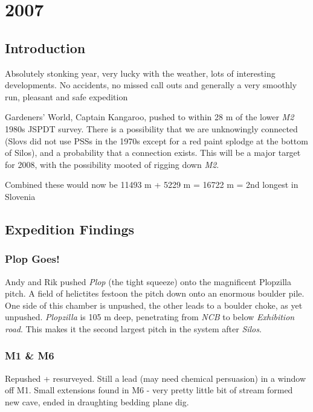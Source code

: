 \hypertarget{section}{%
\chapter{2007}\label{section}}

\hypertarget{introduction}{%
\section{Introduction}\label{introduction}}

Absolutely stonking year, very lucky with the weather, lots of
interesting developments. No accidents, no missed call outs and
generally a very smoothly run, pleasant and safe expedition

Gardeners' World, Captain Kangaroo, pushed to within 28 m of the lower
\emph{M2} 1980s JSPDT survey. There is a possibility that we are
unknowingly connected (Slovs did not use PSSs in the 1970s except for a
red paint splodge at the bottom of Silos), and a probability that a
connection exists. This will be a major target for 2008, with the
possibility mooted of rigging down \emph{M2}.

Combined these would now be 11493 m + 5229 m = 16722 m = 2nd longest in
Slovenia

\hypertarget{expedition-findings}{%
\section{Expedition Findings}\label{expedition-findings}}

\hypertarget{plop-goes}{%
\subsection{Plop Goes!}\label{plop-goes}}

Andy and Rik pushed \emph{Plop} (the tight squeeze) onto the magnificent
Plopzilla pitch. A field of helictites festoon the pitch down onto an
enormous boulder pile. One side of this chamber is unpushed, the other
leads to a boulder choke, as yet unpushed. \emph{Plopzilla} is 105 m
deep, penetrating from \emph{NCB} to below \emph{Exhibition road}. This
makes it the second largest pitch in the system after \emph{Silos}.

\hypertarget{m1-m6}{%
\subsection{M1 \& M6}\label{m1-m6}}

Repushed + resurveyed. Still a lead (may need chemical persuasion) in a
window off M1. Small extensions found in M6 - very pretty little bit of
stream formed new cave, ended in draughting bedding plane dig.


